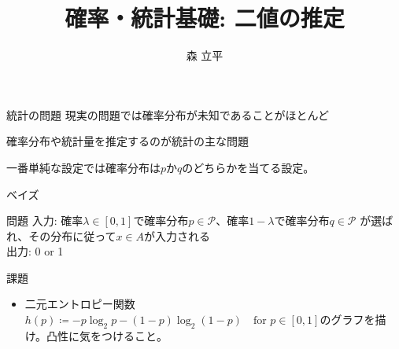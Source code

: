 \documentclass[lualatex,handout]{beamer}
\title{確率・統計基礎: 二値の推定}
\author{森 立平}
\date{}
\newcommand\KL[2]{D\left(#1\,\|\,#2\right)}
\theoremstyle{definition}
\begin{document}
\begin{frame}[plain]
\maketitle
\end{frame}


\begin{frame}{統計の問題}
現実の問題では確率分布が未知であることがほとんど

\vspace{2em}
確率分布や統計量を推定するのが統計の主な問題

\vspace{2em}
一番単純な設定では確率分布は$p$か$q$のどちらかを当てる設定。
\end{frame}

\begin{frame}{ベイズ}
\begin{block}{問題}
入力: 確率$\lambda\in[0,1]$で確率分布$p\in\mathcal{P}$、確率$1-\lambda$で確率分布$q\in\mathcal{P}$
が選ばれ、その分布に従って$x\in A$が入力される\\
\vspace{2em}
出力: 0 or 1
\end{block}
\end{frame}

\begin{frame}{課題}
\begin{itemize}
\item 二元エントロピー関数$h(p)\coloneq -p\log_2 p - (1-p)\log_2(1-p)\quad\text{for } p\in[0,1]$のグラフを描け。凸性に気をつけること。
\end{itemize}
\end{frame}
\end{document}

